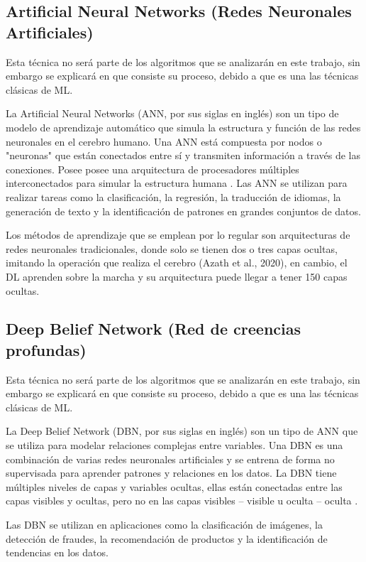 \subsection{Artificial Neural Networks (Redes Neuronales Artificiales)}
Esta técnica no será parte de los algoritmos que se analizarán en este trabajo, sin embargo se explicará en que consiste su proceso, debido a que es una las técnicas clásicas de ML. \\
\par La Artificial Neural Networks (ANN, por sus siglas en inglés) son un tipo de modelo de aprendizaje automático que simula la estructura y función de las redes neuronales en el cerebro humano. Una ANN está compuesta por nodos o "neuronas" que están conectados entre sí y transmiten información a través de las conexiones. Posee posee una arquitectura de procesadores múltiples interconectados para simular la estructura humana \cite{salas2004redes}. Las ANN se utilizan para realizar tareas como la clasificación, la regresión, la traducción de idiomas, la generación de texto y la identificación de patrones en grandes conjuntos de datos.\\
\par Los métodos de aprendizaje que se emplean por lo regular son arquitecturas de redes neuronales tradicionales, donde solo se tienen dos o tres capas ocultas, imitando la operación que realiza el cerebro (Azath et al., 2020), en cambio, el DL aprenden sobre la marcha y su arquitectura puede llegar a tener 150 capas ocultas. \\

\doublespacing
\subsection{Deep Belief Network (Red de creencias profundas)}
Esta técnica no será parte de los algoritmos que se analizarán en este trabajo, sin embargo se explicará en que consiste su proceso, debido a que es una las técnicas clásicas de ML. \\
\par La Deep Belief Network (DBN, por sus siglas en inglés) son un tipo de ANN que se utiliza para modelar relaciones complejas entre variables. Una DBN es una combinación de varias redes neuronales artificiales y se entrena de forma no supervisada para aprender patrones y relaciones en los datos.  La DBN tiene múltiples niveles de capas y variables ocultas, ellas están conectadas entre las capas visibles y ocultas, pero no en las capas visibles – visible u oculta – oculta \cite{PuertaBarrera2015}.\\
\par Las DBN se utilizan en aplicaciones como la clasificación de imágenes, la detección de fraudes, la recomendación de productos y la identificación de tendencias en los datos. \\

